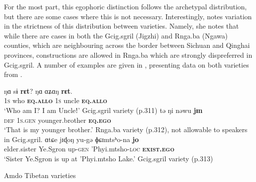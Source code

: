 For the most part, this egophoric distinction follows the archetypal distribution, but there are some cases where this is not necessary. Interestingly,  notes variation in the strictness of this distribution between varieties. Namely, she notes that while there are cases in both the Gcig.sgril (Jigzhi) and Rnga.ba (Ngawa) counties, which are neighbouring across the border between Sichuan and Qinghai provinces, constructions are allowed in Rnga.ba which are strongly dispreferred in Gcig.sgril. A number of examples are given in , presenting data on both varieties from .

\begin{exe}
    \ex\label{e:Discussion:Amdo}
    \begin{xlist}
        \ex \label{e:Discussion:Amdo:A}
        \gll ŋɑ sɨ \textbf{rɛt}? ŋɑ ɑʑɑŋ \textbf{rɛt}. \\
        \textsc{1s} who \textsc{\textbf{eq.allo}} \textsc{1s} uncle \textsc{\textbf{eq.allo}} \\
        \glt `Who am I? I am Uncleǃ' Gcig.sgril variety (p.311)
        \ex \label{e:Discussion:Amdo:B}
        \gll tə ŋi nəwu \textbf{jɪn} \\
        \textsc{def} \textsc{1s.gen} younger.brother \textsc{\textbf{eq.ego}} \\
        \glt `That is my younger brother.' Rnga.ba variety (p.312), not allowable to speakers in Gcig.sgril.
        \ex \label{e:Discussion:Amdo:C}
        \gll ɑtɕe jɪɖoŋ yu-gə ɸɕɪmtsʰo-na \textbf{jo} \\
        elder.sister Ye.Sgron up-\textsc{gen} 'Phyi.mtsho-\textsc{loc} \textsc\textbf{{exist.ego}} \\
        `Sister Ye.Sgron is up at 'Phyi.mtsho Lake.' Gcig.sgril variety (p.313)
    \end{xlist}
    Amdo Tibetan varieties \cite[Tibetic: PRC,][311-313, emphasis mine]{Tribur2019}
\end{exe}

